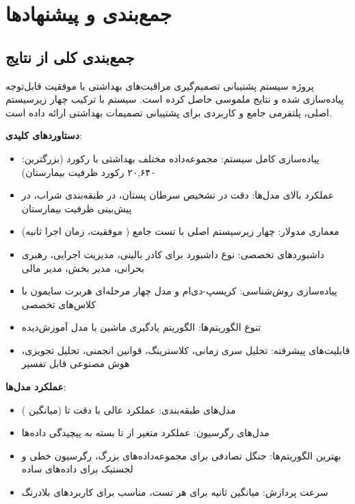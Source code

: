 \documentclass[12pt,a4paper]{article}
\begin{document}
\vspace{1cm}

\newpage
\section{جمع‌بندی و پیشنهادها}\label{sec:conclusion}

\subsection{جمع‌بندی کلی از نتایج}\label{subsec:summary}

پروژه سیستم پشتیبانی تصمیم‌گیری مراقبت‌های بهداشتی با موفقیت قابل‌توجه پیاده‌سازی شده و نتایج ملموسی حاصل کرده است. سیستم با ترکیب چهار زیرسیستم اصلی، پلتفرمی جامع و کاربردی برای پشتیبانی تصمیمات بهداشتی ارائه داده است.

{\yekanfont \textbf{دستاوردهای کلیدی}}:
\begin{itemize}
\item پیاده‌سازی کامل سیستم:  مجموعه‌داده مختلف بهداشتی با  رکورد (بزرگترین: ۲۰,۶۴۰ رکورد ظرفیت بیمارستان)
\item عملکرد بالای مدل‌ها: دقت  در تشخیص سرطان پستان،  در طبقه‌بندی شراب،  در پیش‌بینی ظرفیت بیمارستان
\item معماری مدولار: چهار زیرسیستم اصلی با  تست جامع ( موفقیت، زمان اجرا  ثانیه)
\item داشبوردهای تخصصی:  نوع داشبورد برای کادر بالینی، مدیریت اجرایی، رهبری بحرانی، مدیر بخش، مدیر مالی
\item پیاده‌سازی روش‌شناسی: کریسپ-دی‌ام و مدل چهار مرحله‌ای هربرت سایمون با کلاس‌های تخصصی
\item تنوع الگوریتم‌ها:  الگوریتم یادگیری ماشین با  مدل آموزش‌دیده
\item قابلیت‌های پیشرفته: تحلیل سری زمانی، کلاسترینگ، قوانین انجمنی، تحلیل تجویزی، هوش مصنوعی قابل تفسیر
\end{itemize}

\textbf{عملکرد مدل‌ها}:
\begin{itemize}
\item مدل‌های طبقه‌بندی: عملکرد عالی با دقت  تا  (میانگین )
\item مدل‌های رگرسیون: عملکرد متغیر از  تا  بسته به پیچیدگی داده‌ها
\item بهترین الگوریتم‌ها: جنگل تصادفی برای مجموعه‌داده‌های بزرگ، رگرسیون خطی و لجستیک برای داده‌های ساده
\item سرعت پردازش: میانگین  ثانیه برای هر تست، مناسب برای کاربردهای بلادرنگ
\end{itemize}
\end{document}
